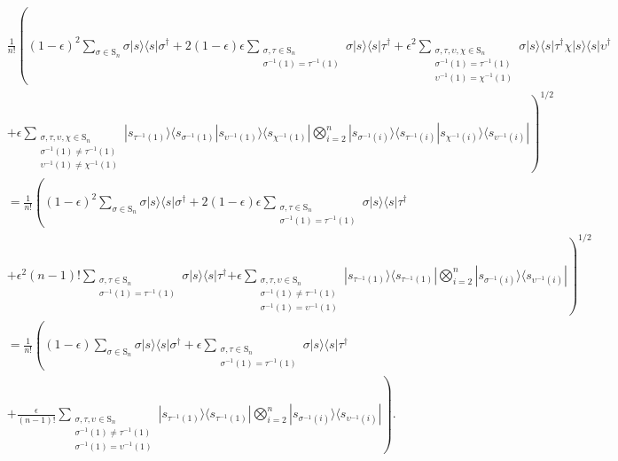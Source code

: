 \begin{align}
&\frac{1}{n!} \left((1-\epsilon)^2\sum_{\sigma\in \textrm{S}_n}\sigma|s\rangle\langle s|\sigma^\dagger + 2(1-\epsilon)\epsilon\sum_{\substack{\sigma,\tau \in \textrm{S}_n\\\sigma^{-1}(1) = \tau^{-1}(1)}}\sigma|s\rangle\langle s|\tau^\dagger+ \epsilon^2\sum_{\substack{\sigma,\tau,\upsilon,\chi \in \textrm{S}_n\\\sigma^{-1}(1) = \tau^{-1}(1)\\\upsilon^{-1}(1) = \chi^{-1}(1)}}\sigma|s\rangle\langle s|\tau^\dagger\chi|s\rangle\langle s|\upsilon^\dagger\right.\nonumber\\
&\left. + \epsilon\sum_{\substack{\sigma,\tau,\upsilon,\chi \in \textrm{S}_n\\\sigma^{-1}(1) \neq \tau^{-1}(1)\\\upsilon^{-1}(1) \neq \chi^{-1}(1)}}|s_{\tau^{-1}(1)}\rangle\langle s_{\sigma^{-1}(1)}|s_{\upsilon^{-1}(1)}\rangle\langle s_{\chi^{-1}(1)}|\bigotimes_{i=2}^n|s_{\sigma^{-1}(i)}\rangle\langle s_{\tau^{-1}(i)}|s_{\chi^{-1}(i)}\rangle\langle s_{\upsilon^{-1}(i)}|\right)^{1/2}\\
&= \frac{1}{n!}\left((1-\epsilon)^2\sum_{\sigma\in \textrm{S}_n}\sigma|s\rangle\langle s|\sigma^\dagger + 2(1-\epsilon)\epsilon\sum_{\substack{\sigma,\tau \in \textrm{S}_n\\\sigma^{-1}(1) = \tau^{-1}(1)}}\sigma|s\rangle\langle s|\tau^\dagger\right.\nonumber\\
&\left.+ \epsilon^2(n-1)!\sum_{\substack{\sigma,\tau \in \textrm{S}_n\\\sigma^{-1}(1) = \tau^{-1}(1)}}\sigma|s\rangle\langle s|\tau^\dagger\right.
\left. + \epsilon\sum_{\substack{\sigma,\tau,\upsilon \in \textrm{S}_n\\\sigma^{-1}(1) \neq \tau^{-1}(1)\\\sigma^{-1}(1) = \upsilon^{-1}(1)}}|s_{\tau^{-1}(1)}\rangle\langle s_{\tau^{-1}(1)}|\bigotimes_{i=2}^n|s_{\sigma^{-1}(i)}\rangle\langle s_{\upsilon^{-1}(i)}|\right)^{1/2} \\
&= \frac{1}{n!}\left((1-\epsilon)\sum_{\sigma\in \textrm{S}_n}\sigma|s\rangle\langle s|\sigma^\dagger + \epsilon\sum_{\substack{\sigma,\tau \in \textrm{S}_n\\\sigma^{-1}(1) = \tau^{-1}(1)}}\sigma|s\rangle\langle s|\tau^\dagger\right.\nonumber\\
&+ \left.\frac{\epsilon}{(n-1)!}\sum_{\substack{\sigma,\tau,\upsilon \in \textrm{S}_n\\\sigma^{-1}(1) \neq \tau^{-1}(1)\\\sigma^{-1}(1) = \upsilon^{-1}(1)}}|s_{\tau^{-1}(1)}\rangle\langle s_{\tau^{-1}(1)}|\bigotimes_{i=2}^n|s_{\sigma^{-1}(i)}\rangle\langle s_{\upsilon^{-1}(i)}|\right).\label{eqn:mismatched-perms}
\end{align}
